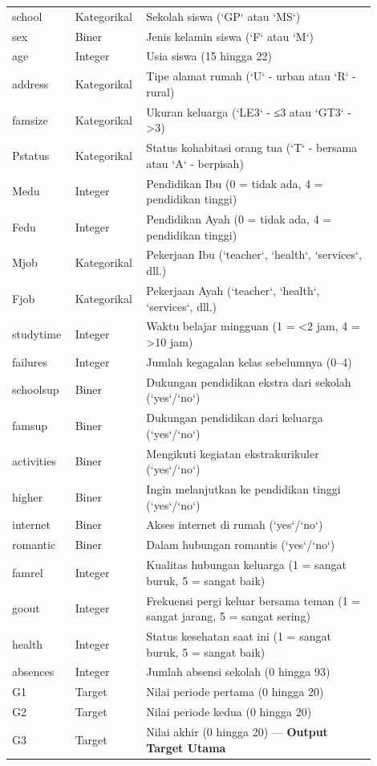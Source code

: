 \begin{longtable}{|p{0.15\linewidth}|p{0.15\linewidth}|p{0.6\linewidth}|}
    school & Kategorikal & Sekolah siswa (`GP` atau `MS`) \\
    sex & Biner & Jenis kelamin siswa (`F` atau `M`) \\
    age & Integer & Usia siswa (15 hingga 22) \\
    address & Kategorikal & Tipe alamat rumah (`U` - urban atau `R` - rural) \\
    famsize & Kategorikal & Ukuran keluarga (`LE3` - ≤3 atau `GT3` - >3) \\
    Pstatus & Kategorikal & Status kohabitasi orang tua (`T` - bersama atau `A` - berpisah) \\
    Medu & Integer & Pendidikan Ibu (0 = tidak ada, 4 = pendidikan tinggi) \\
    Fedu & Integer & Pendidikan Ayah (0 = tidak ada, 4 = pendidikan tinggi) \\
    Mjob & Kategorikal & Pekerjaan Ibu (`teacher`, `health`, `services`, dll.) \\
    Fjob & Kategorikal & Pekerjaan Ayah (`teacher`, `health`, `services`, dll.) \\
    studytime & Integer & Waktu belajar mingguan (1 = <2 jam, 4 = >10 jam) \\
    failures & Integer & Jumlah kegagalan kelas sebelumnya (0–4) \\
    schoolsup & Biner & Dukungan pendidikan ekstra dari sekolah (`yes`/`no`) \\
    famsup & Biner & Dukungan pendidikan dari keluarga (`yes`/`no`) \\
    activities & Biner & Mengikuti kegiatan ekstrakurikuler (`yes`/`no`) \\
    higher & Biner & Ingin melanjutkan ke pendidikan tinggi (`yes`/`no`) \\
    internet & Biner & Akses internet di rumah (`yes`/`no`) \\
    romantic & Biner & Dalam hubungan romantis (`yes`/`no`) \\
    famrel & Integer & Kualitas hubungan keluarga (1 = sangat buruk, 5 = sangat baik) \\
    goout & Integer & Frekuensi pergi keluar bersama teman (1 = sangat jarang, 5 = sangat sering) \\
    health & Integer & Status kesehatan saat ini (1 = sangat buruk, 5 = sangat baik) \\
    absences & Integer & Jumlah absensi sekolah (0 hingga 93) \\
    G1 & Target & Nilai periode pertama (0 hingga 20) \\
    G2 & Target & Nilai periode kedua (0 hingga 20) \\
    G3 & Target & Nilai akhir (0 hingga 20) — \textbf{Output Target Utama} \\
\end{longtable}

